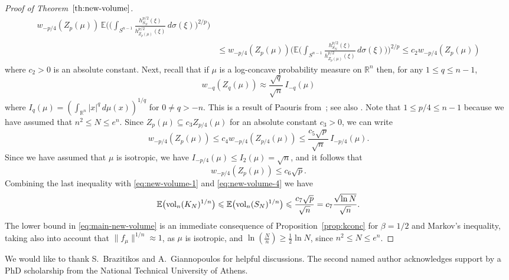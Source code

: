 \documentclass[11pt,leqno]{article}
\theoremstyle{definition}
\theoremstyle{remark}
\numberwithin{equation}{section}
\newcommand{\vol}{{\rm vol}}
\newcommand{\ls}{\leqslant}
\newcommand{\gr}{\geqslant}
\newcommand{\1}{\textbf{1}}
\begin{document}
\begin{proof}[Proof of Theorem~$\ref{th:new-volume}$]
\begin{align}
w_{-p/4}(Z_p(\mu ))\,\mathbb{E}\Bigg(\Bigg (\int_{S^{n-1}}\frac{h^{p/2}_{S_N}(\xi
)}{h^{p/2}_{Z_p(\mu )}(\xi )}\,d\sigma (\xi )\Bigg )^{2/p}\Bigg)\\
\nonumber &\ls w_{-p/4}(Z_p(\mu ))\Bigg(\mathbb{E}\Bigg (\int_{S^{n-1}}\frac{h^{p/2}_{S_N}(\xi
)}{h^{p/2}_{Z_p(\mu )}(\xi )}\,d\sigma (\xi )\Bigg)\Bigg)^{2/p} \ls c_2w_{-p/4}(Z_p(\mu ))
\end{align}
where $c_2>0$ is an absolute constant. Next, recall that if $\mu $ is a log-concave probability measure on
${\mathbb R}^n$ then, for any $1\ls q\ls n-1$,
\begin{equation*}w_{-q}(Z_q(\mu ))\approx\frac{\sqrt{q}}{\sqrt{n}}\,I_{-q}(\mu )
\end{equation*} where $I_q(\mu )=\left (\int_{{\mathbb R}^n}|x|^q\,d\mu (x)\right )^{1/q}$ for $0\neq q>-n$.
This is a result of Paouris from~\cite{Paouris-2012}; see also \cite[Theorem~5.3.16]{BGVV-book}. Note that $1\ls p/4\ls n-1$ because we have assumed that $n^2\ls N\ls e^{n}$. Since $Z_p(\mu )\subseteq
c_3Z_{p/4}(\mu )$ for an absolute constant $c_3>0$, we can write
\begin{equation*}w_{-p/4}(Z_p(\mu ))\ls c_4w_{-p/4}(Z_{p/4}(\mu ))\ls
\frac{c_5\sqrt{p}}{\sqrt{n}}\,I_{-p/4}(\mu ).\end{equation*}
Since we have assumed that
$\mu $ is isotropic, we have $I_{-p/4}(\mu )\ls I_2(\mu )=\sqrt{n}$, and it follows that
\begin{equation*}w_{-p/4}(Z_p(\mu ))\ls c_6\sqrt{p}.\end{equation*}
Combining the last inequality with \eqref{eq:new-volume-1} and \eqref{eq:new-volume-4}  we have
\begin{equation*}\mathbb{E}\big(\vol_n(K_N)^{1/n}\big)\ls \mathbb{E}\big(\vol_n(S_N)^{1/n}\big)\ls \frac{c_7\sqrt{p}}{\sqrt{n}}=
c_7\frac{\sqrt{\ln N}}{\sqrt{n}}.\end{equation*}
The lower bound in \eqref{eq:main-new-volume} is an immediate consequence of Proposition~\ref{prop:kconc} for $\beta=1/2$ and Markov's inequality, taking also into account that $\|f_\mu\|^{1/n} \approx 1$, as $\mu$ is isotropic, and $\ln(\frac{N}{n}) \gr \frac{1}{2}\ln N$, since $n^2 \ls N \ls e^n$.
\end{proof}


\bigskip

 We would like to thank S.~Brazitikos and A.~Giannopoulos
for helpful discussions. The second named author acknowledges support by a PhD scholarship
from the National Technical University of Athens.
\end{document}
